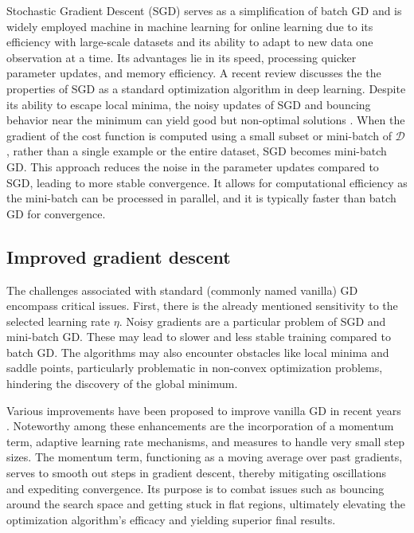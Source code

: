 Stochastic Gradient Descent (SGD) \cite{Bottou2012Stochasticgradientdescent} serves as a simplification of batch GD and is widely employed machine in machine learning for online learning due to its efficiency with large-scale datasets and its ability to adapt to new data one observation at a time. Its advantages lie in its speed, processing quicker parameter updates, and memory efficiency. A recent review \cite{Tian2023RecentAdvancesStochastic} discusses the the properties of SGD as a standard optimization algorithm in deep learning. Despite its ability to escape local minima, the noisy updates of SGD and bouncing behavior near the minimum can yield good but non-optimal solutions . When the gradient of the cost function is computed using a small subset or mini-batch of $\mathcal{D}$, rather than a single example or the entire dataset, SGD becomes mini-batch GD. This approach reduces the noise in the parameter updates compared to SGD, leading to more stable convergence. It allows for computational efficiency as the mini-batch can be processed in parallel, and it is typically faster than batch GD for convergence.

\subsection{Improved gradient descent}
The challenges associated with standard (commonly named vanilla) GD encompass critical issues. First, there is the already mentioned sensitivity to the selected learning rate $\eta$. Noisy gradients are a particular problem of SGD and mini-batch GD. These may lead to slower and less stable training compared to batch GD. The algorithms may also encounter obstacles like local minima and saddle points, particularly problematic in non-convex optimization problems, hindering the discovery of the global minimum.

Various improvements have been proposed to improve vanilla GD in recent years \cite{Ruder2016overviewgradientdescent,Tian2023RecentAdvancesStochastic}. Noteworthy among these enhancements are the incorporation of a momentum term, adaptive learning rate mechanisms, and measures to handle very small step sizes. The momentum term, functioning as a moving average over past gradients, serves to smooth out steps in gradient descent, thereby mitigating oscillations and expediting convergence. Its purpose is to combat issues such as bouncing around the search space and getting stuck in flat regions, ultimately elevating the optimization algorithm's efficacy and yielding superior final results.


